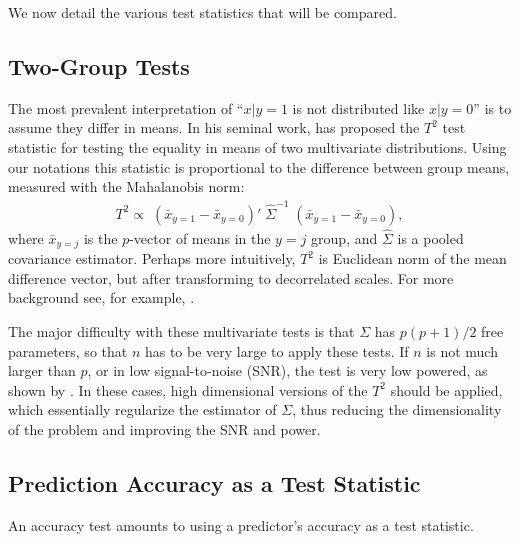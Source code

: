 \documentclass[journal]{IEEEtran}
\begin{document}
We now detail the various test statistics that will be compared.


\subsection{Two-Group Tests}
The most prevalent interpretation of ``$x|y=1$ is not distributed like $x|y=0$'' is to assume they differ in means. 
In his seminal work, \cite{hotelling_generalization_1931} has proposed the $T^2$ test statistic for testing the equality in means of two multivariate distributions. 
Using our notations this statistic is proportional to the difference between group means, measured with the Mahalanobis norm: 
\begin{align}
T^2 \propto \; (\bar{x}_{y=1}-\bar{x}_{y=0})'\; \hat{\Sigma}^{-1} \;(\bar{x}_{y=1}-\bar{x}_{y=0}), 
\end{align}
where $\bar{x}_{y=j}$ is the $p$-vector of means in the $y=j$ group, and $\hat{\Sigma}$ is a pooled covariance estimator.
Perhaps more intuitively, $T^2$ is Euclidean norm of the mean difference vector, but after transforming to decorrelated scales. 
For more background see, for example, \cite{anderson_introduction_2003}.

The major difficulty with these multivariate tests is that $\Sigma$ has $p(p+1)/2$ free parameters, so that $n$ has to be very large to apply these tests.
If $n$ is not much larger than $p$, or in low signal-to-noise (SNR), the test is very low powered, as shown by \cite{bai1996effect}. 
In these cases, high dimensional versions of the $T^2$ should be applied, which essentially regularize the estimator of $\Sigma$, thus reducing the dimensionality of the problem and improving the SNR and power.



\subsection{Prediction Accuracy as a Test Statistic}
An accuracy test amounts to using a predictor's accuracy as a test statistic.  
\end{document}
